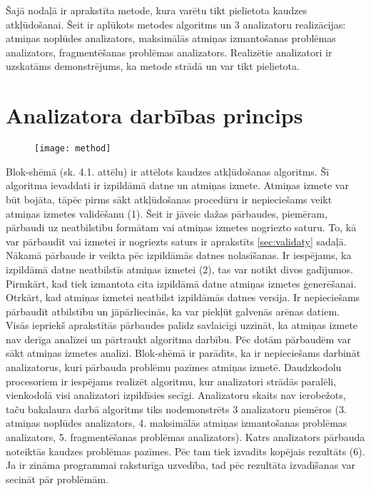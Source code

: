 ﻿Šajā nodaļā ir aprakstīta metode, kura varētu tikt pielietota kaudzes atkļūdošanai. Šeit ir aplūkots metodes algoritms un 3 analizatoru realizācijas: atmiņas noplūdes analizators, maksimālās atmiņas izmantošanas problēmas analizators, fragmentēšanas problēmas analizators.
Realizētie analizatori ir uzskatāms demonstrējums, ka metode strādā un var tikt pielietota.
\section{Analizatora darbības princips}

 \begin{figure}[h]
\begin{center}
\texttt{[image: method]}
\end{center}
\caption{\textbf{\fontsize{11}{12}\selectfont {Uz metodi balstītā algoritma blok-shēma}}}
\end{figure}

Blok-shēmā (sk. 4.1. attēlu) ir attēlots kaudzes atkļūdošanas algoritms.
Šī algoritma ievaddati ir izpildāmā datne un atmiņas izmete.
Atmiņas izmete var būt bojāta, tāpēc pirms sākt atkļūdošanas procedūru ir nepieciešams veikt atmiņas izmetes validēšanu (1).
Šeit ir jāveic dažas pārbaudes, piemēram, pārbaudi uz neatbilstību formātam vai atmiņas izmetes nogriezto saturu.
To, kā var pārbaudīt vai izmetei ir nogriezts saturs ir aprakstīts \ref{sec:validaty} sadaļā.
Nākamā pārbaude ir veikta pēc izpildāmās datnes nolasīšanas.
Ir iespējams, ka izpildāmā datne neatbilstīs atmiņas izmetei (2), tas var notikt divos gadījumos.
Pirmkārt, kad tiek izmantota cita izpildāmā datne atmiņas izmetes ģenerēšanai.
Otrkārt, kad atmiņas izmetei neatbilst izpildāmās datnes versija.
Ir nepieciešams pārbaudīt atbilstību un jāpārliecinās, ka var piekļūt galvenās arēnas datiem.
Visās iepriekš aprakstītās pārbaudes palīdz savlaicīgi uzzināt, ka atmiņas izmete nav derīga analīzei un pārtraukt algoritma darbību.
Pēc dotām pārbaudēm var sākt atmiņas izmetes analīzi.
Blok-shēmā ir parādīts, ka ir nepieciešams darbināt analizatorus, kuri  pārbauda problēmu pazīmes atmiņas izmetē.
Daudzkodolu procesoriem ir iespējams realizēt algoritmu, kur analizatori strādās paralēli, vienkodolā visi analizatori izpildīsies secīgi.
Analizatoru skaits nav ierobežots, taču bakalaura darbā algoritms tiks nodemonstrēts 3 analizatoru piemēros (3. atmiņas noplūdes analizators, 4. maksimālās atmiņas izmantošanas problēmas analizators, 5. fragmentēšanas problēmas analizators).
Katrs analizators pārbauda noteiktās kaudzes problēmas pazīmes.
Pēc tam tiek izvadīts kopējais rezultāts (6).
Ja ir zināma programmai raksturīga uzvedība, tad pēc rezultāta izvadīšanas var secināt pār problēmām.

